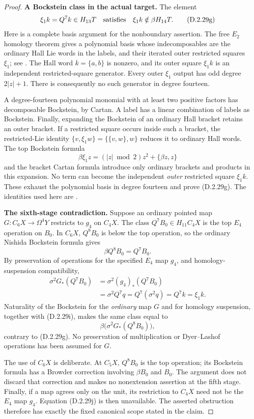 \begin{proof}
\medskip\noindent
\textbf{A Bockstein class in the actual target.}
The element
\[
 \xi_1k=Q^7k\in H_{13}T
 \quad\hbox{satisfies}\quad
 \xi_1k\notin\beta H_{14}T.
 \tag{D.2.29g}
\]
Here is a complete basis argument for the nonboundary assertion.
The free $E_2$ homology theorem gives a polynomial basis whose
indecomposables are the ordinary Hall Lie words in the labels,
and their iterated outer restricted squares $\xi_1$;
see \cite[Chapter~III, Theorems~3.1--3.2 and Lemma~3.8]{I_CohenLadaMay1976}.
The Hall word $k=\{a,b\}$ is nonzero, and its outer square
$\xi_1k$ is an independent restricted-square generator.
Every outer $\xi_1$ output has odd degree $2|z|+1$.
There is consequently no such generator in degree fourteen.

A degree-fourteen polynomial monomial with at least two positive
factors has decomposable Bockstein, by Cartan.  A label has a
linear combination of labels as Bockstein.  Finally, expanding
the Bockstein of an ordinary Hall bracket retains an outer
bracket.  If a restricted square occurs inside such a bracket,
the restricted-Lie identity
$\{v,\xi_1w\}=\{\{v,w\},w\}$ reduces it to ordinary
Hall words.  The top Bockstein formula
\[
 \beta\xi_1z=(|z|\bmod2)z^2+\{\beta z,z\}
 \tag{D.2.29h}
\]
and the bracket Cartan formula introduce only ordinary brackets
and products in this expansion.  No term can become the
independent \emph{outer} restricted square $\xi_1k$.
These exhaust the polynomial basis in degree fourteen and prove
\textup{(D.2.29g)}.  The identities used here are
\cite[Chapter~III, Theorems~1.2--1.4,
pp.~216--219]{I_CohenLadaMay1976}.

\medskip\noindent
\textbf{The sixth-stage contradiction.}
Suppose an ordinary pointed map
$G:C_6X\to\Omega^4Y$ restricts to $g_4$ on $C_4X$.
The class $Q^7B_0\in H_{11}C_4X$ is the top $E_4$
operation on $B_0$.  In $C_6X$, $Q^8B_0$ is below the
top operation, so the ordinary Nishida Bockstein formula gives
\[
 \beta Q^8B_0=Q^7B_0.
 \tag{D.2.29i}
\]
By preservation of operations for the specified $E_4$ map
$g_4$, and homology-suspension compatibility,
\[
 \begin{split}
 \sigma^2G_*(Q^7B_0)
   &=\sigma^2(g_4)_*(Q^7B_0)\\
   &=\sigma^2Q^7q
     =Q^7(\sigma^2q)=Q^7k=\xi_1k.
 \end{split}
 \tag{D.2.29j}
\]
Naturality of the Bockstein for the \emph{ordinary} map $G$
and for homology suspension, together with
\textup{(D.2.29i)}, makes the same class equal to
\[
 \beta\bigl(\sigma^2G_*(Q^8B_0)\bigr),
\]
contrary to \textup{(D.2.29g)}.
No preservation of multiplication or Dyer--Lashof operations
has been assumed for $G$.

The use of $C_6X$ is deliberate.  At $C_5X$, $Q^8B_0$
is the top operation; its Bockstein formula has a Browder
correction involving $\beta B_0$ and $B_0$.
The argument does not discard that correction and makes no
nonextension assertion at the fifth stage.
Finally, if a map agrees only on the unit, its restriction to
$C_4X$ need not be the $E_4$ map $g_4$.
Equation \textup{(D.2.29j)} is then unavailable.
The asserted obstruction therefore has exactly the fixed
canonical scope stated in the claim.
\end{proof}
